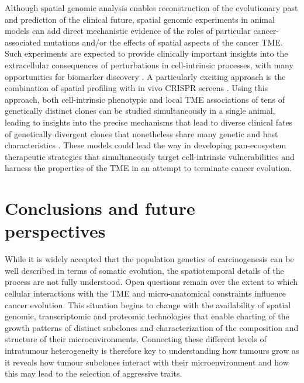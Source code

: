 Although spatial genomic analysis enables reconstruction of the evolutionary past and prediction of the clinical future, spatial genomic experiments in animal models can add direct mechanistic evidence of the roles of particular cancer-associated mutations and/or the effects of spatial aspects of the cancer \ac{TME}. Such experiments are expected to provide clinically important insights into the extracellular consequences of perturbations in cell-intrinsic processes, with many opportunities for biomarker discovery \parencite{Van_Maldegem2021-ta,Janiszewska2019-zq}. A particularly exciting approach is the combination of spatial profiling with in vivo CRISPR screens \parencite{Ji2020-gn,Dhainaut2022-nj}. Using this approach, both cell-intrinsic phenotypic and local TME associations of tens of genetically distinct clones can be studied simultaneously in a single animal, leading to insights into the precise mechanisms that lead to diverse clinical fates of genetically divergent clones that nonetheless share many genetic and host characteristics \parencite{Dhainaut2022-nj}. These models could lead the way in developing pan-ecosystem therapeutic strategies that simultaneously target cell-intrinsic vulnerabilities and harness the properties of the \ac{TME} in an attempt to terminate cancer evolution.

\section{Conclusions and future perspectives}

While it is widely accepted that the population genetics of carcinogenesis can be well described in terms of somatic evolution, the spatiotemporal details of the process are not fully understood. Open questions remain over the extent to which cellular interactions with the \ac{TME} and micro-anatomical constraints influence cancer evolution. This situation begins to change with the availability of spatial genomic, transcriptomic and proteomic technologies that enable charting of the growth patterns of distinct subclones and characterization of the composition and structure of their microenvironments. Connecting these different levels of intratumour heterogeneity is therefore key to understanding how tumours grow as it reveals how tumour subclones interact with their microenvironment and how this may lead to the selection of aggressive traits.

